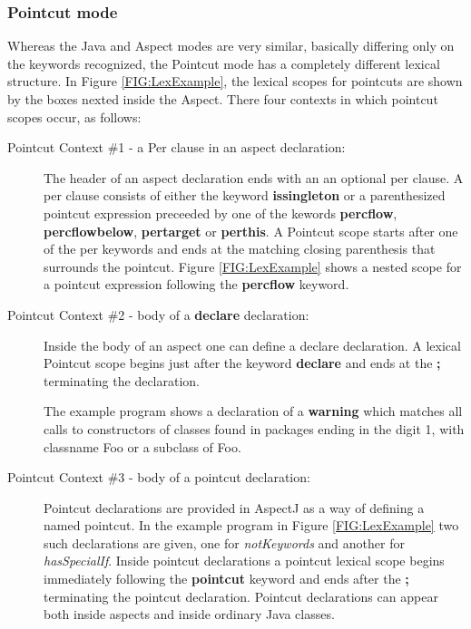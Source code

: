 \subsubsection{{\sc Pointcut} mode}
Whereas the {\sc Java} and {\sc Aspect} modes are very similar, basically
differing only on the keywords recognized, the {\sc Pointcut} mode
has a completely different lexical structure.   
In Figure \ref{FIG:LexExample},  the lexical scopes for pointcuts are
shown by the boxes nexted inside the Aspect.   There four contexts in
which pointcut scopes occur, as follows:

\begin{description}
\item[Pointcut Context \#1 - a Per clause in an aspect declaration:]
The header of an aspect
declaration ends with an an optional per clause.  A per clause consists
of either the keyword {\bf issingleton} or  a parenthesized pointcut
expression preceeded by one of the kewords {\bf percflow}, 
{\bf percflowbelow}, {\bf pertarget} or {\bf perthis}.    
A {\sc Pointcut} scope starts after one of the per keywords and ends at
the matching closing parenthesis that surrounds the pointcut.   Figure
\ref{FIG:LexExample} shows a nested scope for a pointcut expression 
following the {\bf percflow} keyword.

\item[Pointcut Context \#2 - body of a {\bf declare} declaration:]
Inside the body of an aspect one can define
a declare declaration.   A lexical {\sc Pointcut} scope begins just after
the keyword {\bf declare} and ends at the {\bf ;} terminating the 
declaration.  

The example program shows a  
declaration of  a {\bf warning} which matches all calls to constructors of
classes found in packages ending in the digit 1, with classname Foo or
a subclass of Foo. 

\item[Pointcut Context \#3 - body of a pointcut declaration:]

Pointcut declarations are provided in AspectJ as a way of 
defining a named pointcut.  In the example program in 
Figure \ref{FIG:LexExample} two such declarations are given, one
for {\em notKeywords} and another for {\em hasSpecialIf}.   
Inside pointcut declarations a pointcut lexical scope begins
immediately following the {\bf pointcut} keyword and ends 
after the {\bf ;} terminating the pointcut declaration.
Pointcut declarations can appear both inside aspects and inside
ordinary Java classes.


\end{description}
